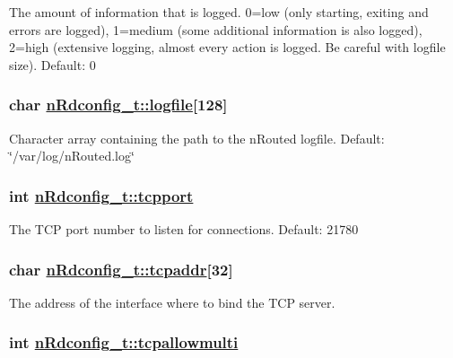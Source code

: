 The amount of information that is logged. 0=low (only starting, exiting and errors are logged), 1=medium (some additional information is also logged), 2=high (extensive logging, almost every action is logged. Be careful with logfile size). Default: 0 \hypertarget{structnRdconfig__t_5dbdadb12b1dfa4a7266f0ac7b4c9ee6}{
\subsubsection[logfile]{\setlength{\rightskip}{0pt plus 5cm}char \hyperlink{structnRdconfig__t_5dbdadb12b1dfa4a7266f0ac7b4c9ee6}{n\-Rdconfig\_\-t::logfile}\mbox{[}128\mbox{]}}}
\label{structnRdconfig__t_5dbdadb12b1dfa4a7266f0ac7b4c9ee6}


Character array containing the path to the n\-Routed logfile. Default: \char`\"{}/var/log/n\-Routed.log\char`\"{} \hypertarget{structnRdconfig__t_38a3366fe88f4f983001879c3d21532b}{
\subsubsection[tcpport]{\setlength{\rightskip}{0pt plus 5cm}int \hyperlink{structnRdconfig__t_38a3366fe88f4f983001879c3d21532b}{n\-Rdconfig\_\-t::tcpport}}}
\label{structnRdconfig__t_38a3366fe88f4f983001879c3d21532b}


The TCP port number to listen for connections. Default: 21780 \hypertarget{structnRdconfig__t_7bc3c655e748fa2f111b01c18ce42e30}{
\subsubsection[tcpaddr]{\setlength{\rightskip}{0pt plus 5cm}char \hyperlink{structnRdconfig__t_7bc3c655e748fa2f111b01c18ce42e30}{n\-Rdconfig\_\-t::tcpaddr}\mbox{[}32\mbox{]}}}
\label{structnRdconfig__t_7bc3c655e748fa2f111b01c18ce42e30}


The address of the interface where to bind the TCP server. \hypertarget{structnRdconfig__t_8b2003cf3fd6431e43d6e53ec563a968}{
\subsubsection[tcpallowmulti]{\setlength{\rightskip}{0pt plus 5cm}int \hyperlink{structnRdconfig__t_8b2003cf3fd6431e43d6e53ec563a968}{n\-Rdconfig\_\-t::tcpallowmulti}}}
\label{structnRdconfig__t_8b2003cf3fd6431e43d6e53ec563a968}


